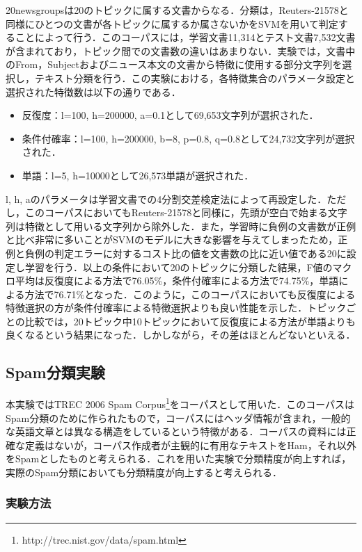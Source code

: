 \documentclass[japanese]{jnlp_1.4}
\begin{document}
20newsgroupsは20のトピックに属する文書からなる．分類は，Reuters-21578と同様にひとつの文書が各トピックに属するか属さないかをSVMを用いて判定することによって行う．このコーパスには，学習文書11,314とテスト文書7,532文書が含まれており，トピック間での文書数の違いはあまりない．実験では，文書中のFrom，Subjectおよびニュース本文の文書から特徴に使用する部分文字列を選択し，テキスト分類を行う．この実験における，各特徴集合のパラメータ設定と選択された特徴数は以下の通りである．

\begin{itemize}
\item 反復度：l=100, h=200000, a=0.1として69,653文字列が選択された．
\item 条件付確率：l=100, h=200000, b=8, p=0.8, q=0.8として24,732文字列が選択された．
\item 単語：l=5, h=10000として26,573単語が選択された．
\end{itemize}

l, h, aのパラメータは学習文書での4分割交差検定法によって再設定した．ただし，このコーパスにおいてもReuters-21578と同様に，先頭が空白で始まる文字列は特徴として用いる文字列から除外した．また，学習時に負例の文書数が正例と比べ非常に多いことがSVMのモデルに大きな影響を与えてしまったため，正例と負例の判定エラーに対するコスト比の値を文書数の比に近い値である20に設定し学習を行う．以上の条件において20のトピックに分類した結果，F値のマクロ平均は反復度による方法で76.05{\%}，条件付確率による方法で74.75{\%}，単語による方法で76.71{\%}となった．このように，このコーパスにおいても反復度による特徴選択の方が条件付確率による特徴選択よりも良い性能を示した．トピックごとの比較では，20トピック中10トピックにおいて反復度による方法が単語よりも良くなるという結果になった．しかしながら，その差はほとんどないといえる．


\subsection{Spam分類実験}

本実験ではTREC 2006 Spam Corpus\footnote{ 
http://trec.nist.gov/data/spam.html}をコーパスとして用いた．このコーパスはSpam分類のために作られたもので，コーパスにはヘッダ情報が含まれ，一般的な英語文章とは異なる構造をしているという特徴がある．コーパスの資料には正確な定義はないが，コーパス作成者が主観的に有用なテキストをHam，それ以外をSpamとしたものと考えられる．これを用いた実験で分類精度が向上すれば，実際のSpam分類においても分類精度が向上すると考えられる．


\subsubsection{実験方法}
\end{document}
